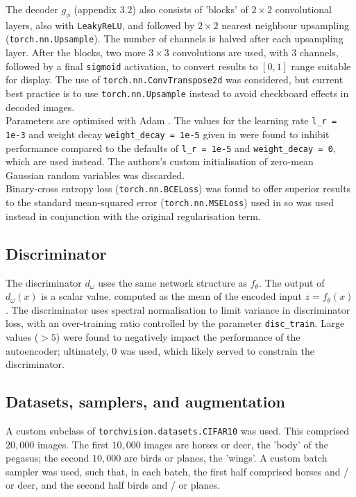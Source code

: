 \documentclass[11pt]{article} %
\begin{document}
The decoder $g_\phi$ (appendix $3.2$) also consists of 'blocks' of $2 \times 2$ convolutional layers, also with \verb|LeakyReLU|, and followed by $2 \times 2$ nearest neighbour upsampling (\verb|torch.nn.Upsample|). The number of channels is halved after each upsampling layer. After the blocks, two more $3 \times 3$ convolutions are used, with $3$ channels, followed by a final \verb|sigmoid| activation, to convert results to $[0, 1]$ range suitable for display. The use of \verb|torch.nn.ConvTranspose2d| was considered, but current best practice is to use \verb|torch.nn.Upsample| instead to avoid checkboard effects in decoded images.\\ 

Parameters are optimised with Adam \cite{kingma_welling_2014}. The values for the learning rate \verb|l_r = 1e-3| and weight decay \verb|weight_decay = 1e-5| given in \cite{berthelot_et_al_2019} were found to inhibit performance compared to the defaults of \verb|l_r = 1e-5| and \verb|weight_decay = 0|, which are used instead. The authors's custom initialisation of zero-mean Gaussian random variables was discarded. \\

Binary-cross entropy loss (\verb|torch.nn.BCELoss|) was found to offer superior results to the standard mean-squared error (\verb|torch.nn.MSELoss|) used in \cite{berthelot_et_al_2019} so was used instead in conjunction with the original regularisation term.

\subsection{Discriminator}

The discriminator $d_\omega$ uses the same network structure as $f_\theta$. The output of $d_\omega(x)$ is a scalar value, computed as the mean of the encoded input $z = f_\theta(x)$. The discriminator uses spectral normalisation \cite{miyato_2018} to limit variance in discriminator loss, with an over-training ratio controlled by the parameter \verb|disc_train|. Large values ($ >5$) were found to negatively impact the performance of the autoencoder; ultimately, $0$ was used, which likely served to constrain the discriminator.

\subsection{Datasets, samplers, and augmentation}

A custom subclass of \verb|torchvision.datasets.CIFAR10| was used. This comprised $20,000$ images. The first $10,000$ images are horses or deer, the 'body' of the pegasus; the second $10,000$ are birds or planes, the 'wings'. A custom batch sampler was used, such that, in each batch, the first half comprised horses and / or deer, and the second half birds and / or planes.\\
\end{document}
